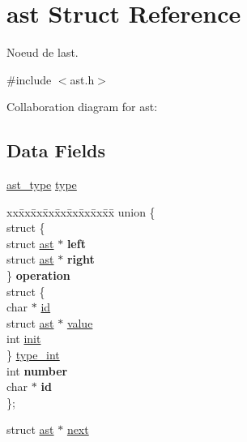 \hypertarget{structast}{}\section{ast Struct Reference}
\label{structast}


Noeud de l\textquotesingle{}ast.  




{\ttfamily \#include $<$ast.\+h$>$}



Collaboration diagram for ast\+:
\subsection*{Data Fields}
\begin{DoxyCompactItemize}
\item 
\hyperlink{ast_8h_a77091c187ac9a89404fac2e8226daef3}{ast\+\_\+type} \hyperlink{structast_a8321fc8e556a418583dd74ee9fcc2bf7}{type}
\item 
\mbox{\label{structast_aa607c7a27d555cb2310d47623165269a}} 
\begin{tabbing}
xx\=xx\=xx\=xx\=xx\=xx\=xx\=xx\=xx\=\kill
union \{\\
\>struct \{\\
\>\>struct \hyperlink{structast}{ast} $\ast$ {\bfseries left}\\
\>\>struct \hyperlink{structast}{ast} $\ast$ {\bfseries right}\\
\>\} {\bfseries operation}\\
\>struct \{\\
\>\>char $\ast$ \hyperlink{structast_aecb3b0d045ada529257a2fbf8f829599}{id}\\
\>\>struct \hyperlink{structast}{ast} $\ast$ \hyperlink{structast_a0547e48c9f9ecb35c94f988890f217b7}{value}\\
\>\>int \hyperlink{structast_a795ea50921b36311ffd5e7baa2ef1f7e}{init}\\
\>\} \hyperlink{structast_a48c1fea64ccd73c68d3901c23d65f9f5}{type\_int}\\
\>int {\bfseries number}\\
\>char $\ast$ {\bfseries id}\\
\}; \\

\end{tabbing}\item 
struct \hyperlink{structast}{ast} $\ast$ \hyperlink{structast_ae48f04f7acec87ecf7f0bc953cb56bf4}{next}
\end{DoxyCompactItemize}


